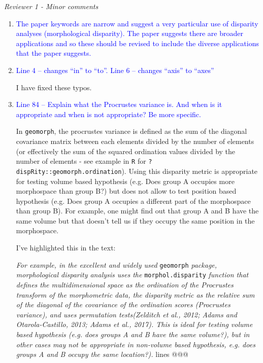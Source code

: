 \documentclass[12pt,letterpaper]{article}
\renewcommand{\subsection}[1]{%
\bigskip
\begin{center}
\begin{large}
\normalfont\itshape #1
\end{large}
\end{center}}
\begin{document}
\subsection{Reviewer 1 - Minor comments}

\begin{enumerate}

\item{\textcolor{blue}{The paper keywords are narrow and suggest a very particular use of disparity analyses (morphological disparity). The paper suggests there are broader applications and so these should be revised to include the diverse applications that the paper suggests. }}


\item{\textcolor{blue}{Line 4 – changes ``in'' to ``to''. Line 6 – changes ``axis'' to ``axes''}}
\label{abstract_typo}

I have fixed these typos.

\item{\textcolor{blue}{Line 84 – Explain what the Procrustes variance is. And when is it appropriate and when is not appropriate? Be more specific.}}
\label{tone_down}

In \texttt{geomorph}, the procrustes variance is defined as the sum of the diagonal covariance matrix between each elements divided by the number of elements (or effectively the sum of the squared ordination values divided by the number of elements - see example in \texttt{R} for \texttt{?dispRity::geomorph.ordination}).
Using this disparity metric is appropriate for testing volume based hypothesis (e.g. Does group A occupies more morphospace than group B?) but does not allow to test position based hypothesis (e.g. Does group A occupies a different part of the morphospace than group B).
For example, one might find out that group A and B have the same volume but that doesn't tell us if they occupy the same position in the morphospace.

I've highlighted this in the text:

\textit{For example, in the excellent and widely used} \texttt{geomorph} \textit{package, morphological disparity analysis uses the} \texttt{morphol.disparity} \textit{function that defines the multidimensional space as the ordination of the Procrustes transform of the morphometric data, the disparity metric as the relative sum of the diagonal of the covariance of the ordination scores (Procrustes variance), and uses permutation tests(Zelditch et al., 2012; Adams and Otarola-Castillo, 2013; Adams et al., 2017). This is ideal for testing volume based hypothesis (e.g. does groups A and B have the same volume?), but in other cases may not be appropriate in non-volume based hypothesis, e.g. does groups A and B occupy the same location?).} lines @@@


\end{enumerate}
\end{document}
